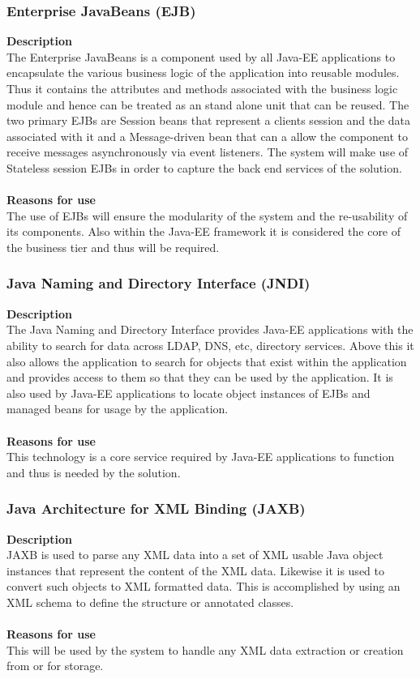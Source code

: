 \documentclass[12pt]{article}
\begin{document}
\subsubsection{Enterprise JavaBeans (EJB)}
\textbf{Description}\\
The Enterprise JavaBeans is a component used by all Java-EE applications to encapsulate the various business logic of the application into reusable modules. Thus it contains the attributes and methods associated with the business logic module and hence can be treated as an stand alone unit that can be reused. The two primary EJBs are Session beans that represent a clients session and the data associated with it and a Message-driven bean that can a allow the component to receive messages asynchronously via event listeners. The system will make use of Stateless session EJBs in order to capture the back end services of the solution.\\\\
\textbf{Reasons for use}\\
The use of EJBs will ensure the modularity of the system and the re-usability of its components. Also within the Java-EE framework it is considered the core of the business tier and thus will be required.
  

\subsubsection{Java Naming and Directory Interface (JNDI)}
\textbf{Description}\\
The Java Naming and Directory Interface provides Java-EE applications with the ability to search for data across LDAP, DNS, etc, directory services. Above this it also allows the application to search for objects that exist within the application and provides access to them so that they can be used by the application. It is also used by Java-EE applications to locate object instances of EJBs and managed beans for usage by the application.\\\\
\textbf{Reasons for use}\\
This technology is a core service required by Java-EE applications to function and thus is needed by the solution.

\subsubsection{Java Architecture for XML Binding (JAXB)}
\textbf{Description}\\
JAXB is used to parse any XML data into a set of XML usable Java object instances that represent the content of the XML data. Likewise it is used to convert such objects to XML formatted data. This is accomplished by using an XML schema to define the structure or annotated classes.\\\\
\textbf{Reasons for use}\\
This will be used by the system to handle any XML data extraction or creation from or for storage.
\end{document}
